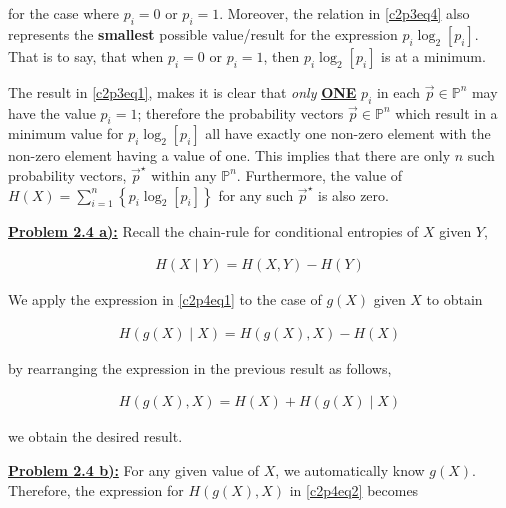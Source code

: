 \documentclass{article}[12pt]
\numberwithin{equation}{subsection}
\newcommand{\prob}[1]{\textbf{\underline{Problem #1):}}}
\begin{document}
\begin{flushleft}
for the case where $p_i = 0$ or $p_i = 1$.  Moreover, the relation in \ref{c2p3eq4} also represents the \textbf{smallest} possible value/result for the expression $p_i \log_2 \left[ p_i \right]$.  That is to say, that when $p_i = 0$ or $p_i = 1$, then $p_i \log_2 \left[ p_i \right]$ is at a minimum.  \newline


The result in \ref{c2p3eq1}, makes it is clear that \emph{only} \textbf{\underline{ONE}} $p_i$ in each $\vec{p} \in \mathbb{P}^n$ may have the value $p_i = 1$; therefore the probability vectors $\vec{p} \in \mathbb{P}^n$ which result in a minimum value for $p_i \log_2 \left[ p_i \right]$ all have exactly one non-zero element with the non-zero element having a value of one.  This implies that there are only $n$ such probability vectors, $\vec{p}^\star$ within any $\mathbb{P}^n$.  Furthermore, the value of $H(X) = \sum_{i=1}^n \left\{ p_i \log_2 \left[ p_i \right] \right\}$ for any such $\vec{p}^\star$ is also zero.



\vspace{0.5in}

\prob{2.4 a}  Recall the chain-rule for conditional entropies of $X$ given $Y$,

\begin{align}  \label{c2p4eq1}
H \left( X \mid Y \right) = H \left( X, Y \right) - H \left( Y \right)  \tag{2.4-1}
\end{align}

We apply the expression in \ref{c2p4eq1} to the case of $g \left( X \right)$ given $X$ to obtain

\begin{align} 
H \left( g \left( X \right) \mid X \right) = H \left( g \left( X \right), X \right) - H \left( X \right) 
\end{align}

by rearranging the expression in the previous result as follows,

\begin{align} \label{c2p4eq2} 
H \left( g \left( X \right), X \right) = H \left( X \right) + H \left( g \left( X \right) \mid X \right)  \tag{2.4-2}
\end{align}

we obtain the desired result.



\vspace{0.5in}

\prob{2.4 b}  For any given value of $X$, we automatically know $g \left( X \right)$.  Therefore, the expression for $H \left( g \left( X \right), X \right)$ in \ref{c2p4eq2} becomes


\end{flushleft}
\end{document}
